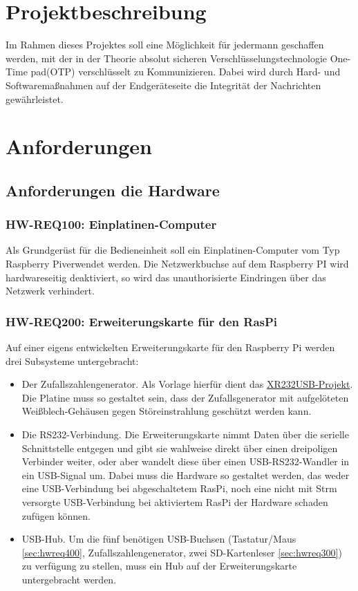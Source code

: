 \section{Projektbeschreibung}
\label{sec:projektbeschreibung}

Im Rahmen dieses Projektes soll eine Möglichkeit für jedermann geschaffen
werden, mit der in der Theorie absolut sicheren Verschlüsselungstechnologie
\glqq One-Time pad\grqq (OTP) verschlüsselt zu Kommunizieren. Dabei wird durch Hard-
und Softwaremaßnahmen auf der Endgeräteseite die Integrität der Nachrichten
gewährleistet. 

\section{Anforderungen}
\label{sec:requirements}

\subsection{Anforderungen die Hardware}
\label{sec:anforderungen-hardware}

\subsubsection{HW-REQ100: Einplatinen-Computer}
\label{sec:hwreq100}
Als Grundgerüst für die Bedieneinheit soll ein Einplatinen-Computer vom Typ
\glqq Raspberry Pi\grqq verwendet werden. Die Netzwerkbuchse auf dem Raspberry
PI wird hardwareseitig deaktiviert, so wird das unauthorisierte Eindringen über
das Netzwerk verhindert. 

\subsubsection{HW-REQ200: Erweiterungskarte für den RasPi}
\label{sec:hwreq200}
Auf einer eigens entwickelten Erweiterungskarte für
den Raspberry Pi werden drei Subsysteme untergebracht:
\begin{itemize}
	\item Der Zufallszahlengenerator. Als Vorlage hierfür dient das
		\hyperlink{http://www.jtxp.org/tech/xr232usb.htm}{XR232USB-Projekt}. Die Platine
		muss so gestaltet sein, dass der Zufallsgenerator mit aufgelöteten
		Weißblech-Gehäusen gegen Störeinstrahlung geschützt werden kann. 
	\item Die RS232-Verbindung. Die Erweiterungskarte nimmt Daten über die
serielle Schnittstelle entgegen und gibt sie wahlweise direkt über einen
dreipoligen Verbinder weiter, oder aber wandelt diese über einen
USB-RS232-Wandler in ein USB-Signal um. Dabei muss die Hardware so gestaltet
werden, das weder eine USB-Verbindung bei abgeschaltetem RasPi, noch eine nicht
mit Strm versorgte USB-Verbindung bei aktiviertem RasPi der Hardware schaden
zufügen können.
	\item USB-Hub. Um die fünf benötigen USB-Buchsen (Tastatur/Maus \ref{sec:hwreq400}, Zufallszahlengenerator, zwei SD-Kartenleser \ref{sec:hwreq300})
 zu verfügung zu stellen, muss ein Hub auf der Erweiterungskarte untergebracht werden.
\end{itemize}

